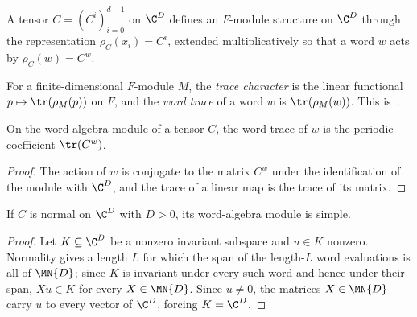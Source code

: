 \begin{definition}
    \label{def:asym_word_module}
    \leanok
    A tensor $C=(C^i)_{i=0}^{d-1}$ on $\C^D$ defines an $F$-module structure
    on $\C^D$ through the representation $\rho_C(x_i)=C^i$, extended
    multiplicatively so that a word $w$ acts by $\rho_C(w)=C^w$.
\end{definition}

\begin{definition}
    \label{def:asym_word_traces}
    \leanok
    For a finite-dimensional $F$-module $M$, the \emph{trace character} is
    the linear functional $p\mapsto\tr(\rho_M(p))$ on $F$, and the
    \emph{word trace} of a word $w$ is $\tr(\rho_M(w))$.
    This is~\cite[``Word traces'']{QICLean2026Blueprint}.
\end{definition}

\begin{lemma}
    \label{lem:asym_word_traces_tensor}
    \leanok
    On the word-algebra module of a tensor $C$, the word trace of $w$ is
    the periodic coefficient $\tr(C^w)$.
\end{lemma}

\begin{proof}
    \leanok
    The action of $w$ is conjugate to the matrix $C^w$ under the
    identification of the module with $\C^D$, and the trace of a linear
    map is the trace of its matrix.
\end{proof}

\begin{lemma}
    \label{lem:asym_normal_simple}
    \leanok
    If $C$ is normal on $\C^D$ with $D>0$, its word-algebra module is
    simple.
\end{lemma}

\begin{proof}
    \leanok
    Let $K\subseteq\C^D$ be a nonzero invariant subspace and $u\in K$
    nonzero. Normality gives a length $L$ for which the span of the
    length-$L$ word evaluations is all of $\MN{D}$; since $K$ is invariant
    under every such word and hence under their span, $Xu\in K$ for every
    $X\in\MN{D}$. Since $u\neq0$, the matrices $X\in\MN{D}$ carry $u$ to
    every vector of $\C^D$, forcing $K=\C^D$.
\end{proof}

